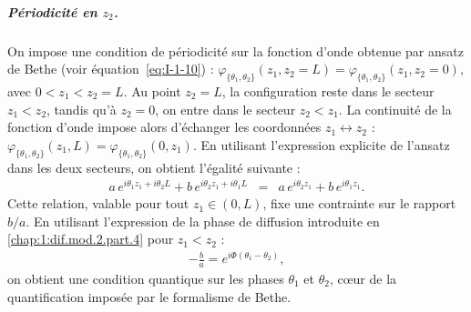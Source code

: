 
\subparagraph{Périodicité en \( z_2 \).}  
On impose une condition de périodicité sur la fonction d’onde obtenue par ansatz de Bethe (voir équation~\eqref{eq:I-1-10}) :
\(
	\varphi_{\{\theta_1,\theta_2\}}(z_1, z_2 = L) = \varphi_{\{\theta_1,\theta_2\}}(z_1, z_2 = 0),
\)
avec \( 0 < z_1 < z_2 = L \).  
Au point \( z_2 = L \), la configuration reste dans le secteur \( z_1 < z_2 \), tandis qu’à \( z_2 = 0 \), on entre dans le secteur \( z_2 < z_1 \). La continuité de la fonction d’onde impose alors d’échanger les coordonnées \( z_1 \leftrightarrow z_2 \) :
\(
	\varphi_{\{\theta_1,\theta_2\}}(z_1, L) = \varphi_{\{\theta_1,\theta_2\}}(0, z_1).
\)
En utilisant l’expression explicite de l’ansatz dans les deux secteurs, on obtient l’égalité suivante :
\begin{eqnarray*}
	a\,e^{i\theta_1 z_1 + i\theta_2 L} + b\,e^{i\theta_2 z_1 + i\theta_1 L}
	&=& a\,e^{i\theta_2 z_1} + b\,e^{i\theta_1 z_1}.
\end{eqnarray*}
Cette relation, valable pour tout \( z_1 \in (0,L) \), fixe une contrainte sur le rapport \( b/a \). En utilisant l’expression de la phase de diffusion introduite en \eqref{chap:1:dif.mod.2.part.4} pour $z_1<z_2$ :
\begin{eqnarray*}
	-\frac{b}{a} = e^{i\Phi(\theta_1 - \theta_2)},
\end{eqnarray*}
on obtient une condition quantique sur les phases \( \theta_1 \) et \( \theta_2 \), cœur de la quantification imposée par le formalisme de Bethe.

